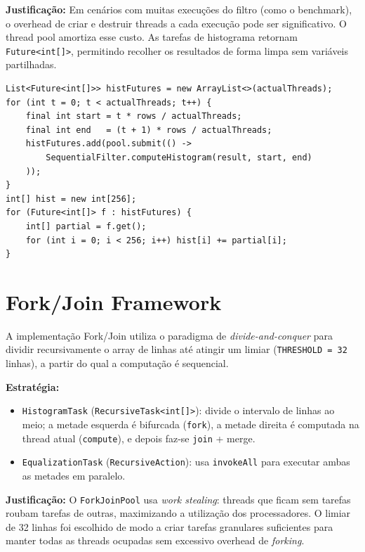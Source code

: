 \documentclass[a4paper,11pt,openright,BCOR=15mm]{scrbook}
\begin{document}
\textbf{Justificação:} Em cenários com muitas execuções do filtro (como o benchmark), o overhead de criar e destruir threads a cada execução pode ser significativo. O thread pool amortiza esse custo. As tarefas de histograma retornam \texttt{Future<int[]>}, permitindo recolher os resultados de forma limpa sem variáveis partilhadas.

\begin{lstlisting}[caption={Submissão de tarefas ao thread pool}]
List<Future<int[]>> histFutures = new ArrayList<>(actualThreads);
for (int t = 0; t < actualThreads; t++) {
    final int start = t * rows / actualThreads;
    final int end   = (t + 1) * rows / actualThreads;
    histFutures.add(pool.submit(() ->
        SequentialFilter.computeHistogram(result, start, end)
    ));
}
int[] hist = new int[256];
for (Future<int[]> f : histFutures) {
    int[] partial = f.get();
    for (int i = 0; i < 256; i++) hist[i] += partial[i]; 
}
\end{lstlisting}

\section{Fork/Join Framework}

A implementação Fork/Join utiliza o paradigma de \textit{divide-and-conquer} para dividir recursivamente o array de linhas até atingir um limiar (\texttt{THRESHOLD = 32} linhas), a partir do qual a computação é sequencial.

\textbf{Estratégia:}
\begin{itemize}
    \item \texttt{HistogramTask} (\texttt{RecursiveTask<int[]>}): divide o intervalo de linhas ao meio; a metade esquerda é bifurcada (\texttt{fork}), a metade direita é computada na thread atual (\texttt{compute}), e depois faz-se \texttt{join} + merge.
    \item \texttt{EqualizationTask} (\texttt{RecursiveAction}): usa \texttt{invokeAll} para executar ambas as metades em paralelo.
\end{itemize}

\textbf{Justificação:} O \texttt{ForkJoinPool} usa \textit{work stealing}: threads que ficam sem tarefas roubam tarefas de outras, maximizando a utilização dos processadores. O limiar de 32 linhas foi escolhido de modo a criar tarefas granulares suficientes para manter todas as threads ocupadas sem excessivo overhead de \textit{forking}.
\end{document}
